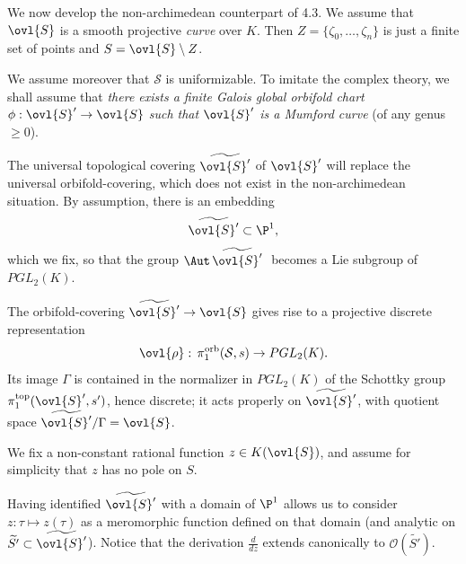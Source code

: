 \begin{para}\label{para::4.6.1} We now develop the non-archimedean counterpart
 of 4.3. We assume that $\ovl{S}$ is a 
 smooth projective {\it curve} over $K$. Then
 $Z=\{\zeta_0,\ldots ,\zeta_n\}$ is just a finite set of points and
 $S=\ovl{S}\setminus Z$.

 We assume moreover that $\mathcal{S}$ is
uniformizable. To imitate the complex theory,
we shall assume that {\it there exists a finite Galois global orbifold
 chart $\phi: \ovl{S}'\to \ovl{S}$ such that $\ovl{S}'$ 
is a Mumford curve} (of any genus $\geq 0$). 

The universal topological covering $\widetilde{\ovl{S}'}$ of
 ${\ovl{S}'}$ will replace the universal 
 orbifold-covering, which does not exist in the non-archimedean
 situation. By assumption, there is an embedding  
  \begin{equation*}
\widetilde{\ovl{S}'} \subset \P^1,
\end{equation*}
 which we fix, so that the group $\Aut\, \widetilde{\ovl{S}'}\;$
 becomes a Lie subgroup of $PGL_2(K)$.

The orbifold-covering $\widetilde{\ovl{S}'}\to \ovl{S}$ gives rise to a
 projective discrete representation 
\begin{equation*}
\ovl{\rho}:\,\pi_1^{\mathrm{orb}}(\mathcal{S},s) \to PGL_2(K).
\end{equation*}
 Its image $\Gamma$ is contained in the normalizer in $PGL_2(K)$ of the 
Schottky group $\pi_1^{\mathrm{top}}({\ovl{S}'},s')$, hence discrete; it
 acts properly on $\widetilde{\ovl{S}'}$, with quotient space 
$\widetilde{\ovl{S}'}/\Gamma=\ovl{S}$.  
\end{para}

\begin{para}\label{para::4.6.2} We fix a non-constant rational function
 $z\in K(\ovl{S})$, and assume for simplicity that $z$ has no 
 pole on $S$. 
 
 \noindent Having identified $\widetilde{\ovl{S}'}$ with a domain of
 $\P^1$ allows us to consider $z: \tau \mapsto z(\tau)$ as a meromorphic
 function defined on that domain (and analytic on 
 $\widetilde{  S'}\subset \widetilde{\ovl{S}'}$). Notice that the derivation
 $\frac{d}{dz}$ extends canonically to $\mathcal{O}(\widetilde{S'})$.  
\end{para}

